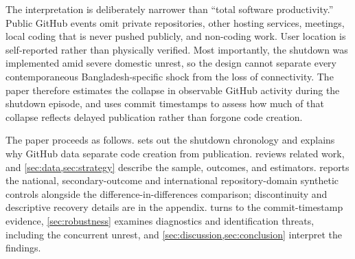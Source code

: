 The interpretation is deliberately narrower than ``total software productivity.'' Public GitHub events omit private repositories, other hosting services, meetings, local coding that is never pushed publicly, and non-coding work. User location is self-reported rather than physically verified. Most importantly, the shutdown was implemented amid severe domestic unrest, so the design cannot separate every contemporaneous Bangladesh-specific shock from the loss of connectivity. The paper therefore estimates the collapse in observable GitHub activity during the shutdown episode, and uses commit timestamps to assess how much of that collapse reflects delayed publication rather than forgone code creation.

The paper proceeds as follows.  sets out the shutdown chronology and explains why GitHub data separate code creation from publication.  reviews related work, and \cref{sec:data,sec:strategy} describe the sample, outcomes, and estimators.  reports the national, secondary-outcome and international repository-domain synthetic controls alongside the difference-in-differences comparison; discontinuity and descriptive recovery details are in the appendix.  turns to the commit-timestamp evidence, \cref{sec:robustness} examines diagnostics and identification threats, including the concurrent unrest, and \cref{sec:discussion,sec:conclusion} interpret the findings.
